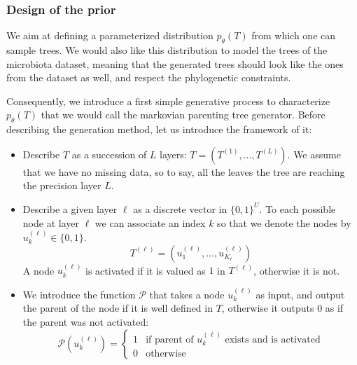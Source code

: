 \subsubsection{Design of the prior}


We aim at defining a parameterized distribution $p_{\theta}(T)$ from which one can sample trees.
We would also like this distribution to model the trees of the microbiota dataset, meaning that
the generated trees should look like the ones from the dataset as well, and respect the phylogenetic constraints. \\

\newcommand{\nodeparent}{\mathcal{P}}

Consequently, we introduce a first simple generative process to characterize $p_{\theta}(T)$ that we would call the markovian parenting tree generator.
Before describing the generation method, let us introduce the framework of it:
\begin{itemize}
    \item Describe $T$ as a succession of $L$ layers: $T = (T^{(1)}, \dots, T^{(L)})$.
    We assume that we have no missing data, so to say, all the leaves the tree are reaching the precision layer $L$.
    \item Describe a given layer $\ell$ as a discrete vector in $\{0, 1\}^{U}$.
    To each possible node at layer $\ell$ we can associate an index $k$ so that we denote the nodes by $u_k^{(\ell)} \in \{0, 1\}$.
    $$T^{(\ell)} = (u_1^{(\ell)}, \dots, u_{K_{\ell}}^{(\ell)})$$
    A node $u_k^{(\ell)}$ is activated if it is valued as $1$ in $T^{(\ell)}$, otherwise it is not.
    \item We introduce the function $\nodeparent$ that takes a node $u_k^{(\ell)}$ as input, and output the parent of the node if it is well defined in $T$,
          otherwise it outputs $0$ as if the parent was not activated:
            $$
            \nodeparent(u_k^{(\ell)}) = \left\{
            \begin{array}{ll}
                1 & \mbox{if } \text{parent of $u_k^{(\ell)}$ exists and is activated}\\
                0 & \mbox{otherwise}
            \end{array}
            \right.
            $$
\end{itemize}

